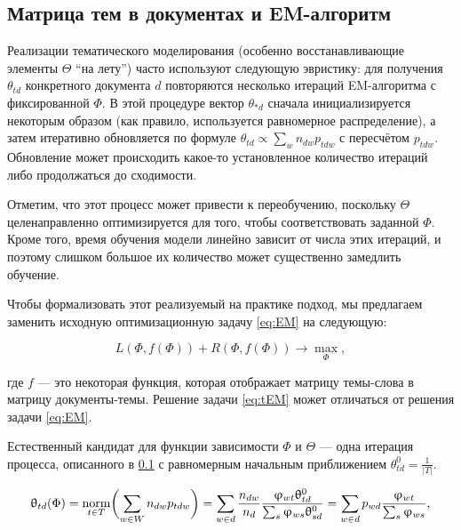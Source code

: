  

\subsection{Матрица тем в документах и EM-алгоритм} 

\label{sec:theta_inference} 

 

Реализации тематического моделирования (особенно  восстанавливающие элементы $\Theta$ ``на лету'') часто используют следующую эвристику: для получения $\theta_{td}$ конкретного документа $d$ повторяются несколько итераций EM-алгоритма с фиксированной $\Phi$. В этой процедуре вектор $\theta_{\ast d}$ сначала инициализируется некоторым образом (как правило, используется равномерное распределение), а затем итеративно обновляется по формуле $\theta_{td}  \propto \sum_{w} n_{dw} p_{tdw}$ с пересчётом $p_{tdw}$. Обновление может происходить какое-то установленное количество итераций либо продолжаться до сходимости. 

 

Отметим, что этот процесс может привести к переобучению, поскольку $\Theta$ целенаправленно оптимизируется для того, чтобы соответствовать заданной $\Phi$. Кроме того, время обучения модели линейно зависит от числа этих итераций, и поэтому слишком большое их количество может существенно замедлить обучение. 

 

Чтобы формализовать этот реализуемый на практике подход, мы предлагаем заменить исходную оптимизационную задачу \ref{eq:EM} на следующую: 

\begin{equation} \label{eq:tEM} 

L(\Phi, f(\Phi) ) + R(\Phi, f(\Phi) ) \to \max_{\Phi}, 

\end{equation} 

 

где $f$ --- это некоторая функция, которая отображает матрицу темы-слова в матрицу документы-темы. Решение задачи \ref{eq:tEM} может отличаться от решения задачи \ref{eq:EM}. 

 

Естественный кандидат для функции зависимости $\Phi$ и $\Theta$ --- одна итерация процесса, описанного в \ref{sec:theta_inference} с равномерным начальным приближением $\theta^0_{td} = \frac1{|T|}$.  

 

\begin{equation} 

\label{eq:thetaform} 

    \theta_{td}(\Phi) 

    = \norm_{t\in T} \biggl( \sum_{w\in W} n_{dw} p_{tdw} \biggr) 

    = \sum_{w\in d} \frac{n_{dw}}{n_d} \frac{\phi_{wt} \theta^0_{td}}{\sum_s \phi_{ws} \theta^0_{sd}} 

    = \sum_{w\in d} p_{wd} \frac{\phi_{wt}}{\sum_s \phi_{ws}}, 

\end{equation} 

